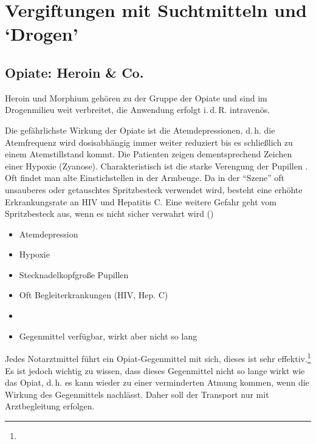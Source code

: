 \section{Vergiftungen mit Suchtmitteln und
\enquote*{Drogen}}

\subsection{Opiate: Heroin \& Co.}

Heroin und Morphium gehören zu der Gruppe der Opiate und
sind im Drogenmilieu weit verbreitet, die Anwendung erfolgt
i.\,d.\,R. intravenös. 

{%
Die gefährlichste Wirkung der Opiate ist die
Atemdepressionen, d.\,h. die Atemfrequenz wird dosisabhängig
immer weiter reduziert bis es schließlich zu einem
Atemstillstand kommt. Die Patienten zeigen
dementsprechend Zeichen einer Hypoxie
(Zyanose). Charakteristisch ist die starke Verengung der
Pupillen . Oft
findet man alte Einstichstellen in der Armbeuge. Da in der
\enquote{Szene} oft unsauberes oder getauschtes Spritzbesteck
verwendet wird, besteht eine erhöhte Erkrankungsrate an HIV
und Hepatitis C. Eine weitere Gefahr geht vom Spritzbesteck
aus, wenn es nicht sicher verwahrt wird ()
}{
\begin{itemize}
    \item Atemdepression
    \item Hypoxie
    \item Stecknadelkopfgroße Pupillen
    \item Oft Begleiterkrankungen (HIV, Hep. C) 
    \item {}
    \item Gegenmittel verfügbar, wirkt aber nicht so lang
\end{itemize}
}{}{}{}

{%
Jedes Notarztmittel führt ein Opiat-Gegenmittel mit sich,
dieses ist sehr effektiv.\footnote{} Es ist
jedoch wichtig zu wissen, dass dieses Gegenmittel nicht so
lange wirkt wie das Opiat, d.\,h. es kann wieder zu einer
verminderten Atmung kommen, wenn die Wirkung des
Gegenmittels nachlässt. Daher soll der Transport nur mit
Arztbegleitung erfolgen.

}{

}{}{}{}


